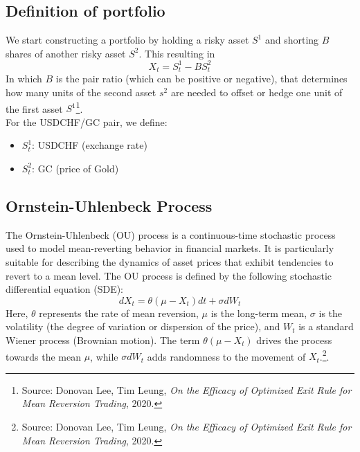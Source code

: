 \documentclass{article}
\begin{document}
\subsection*{Definition of portfolio}
We start constructing a portfolio by holding a risky asset $S^1$ and shorting $B$ shares of another risky asset $S^2$. This resulting in
\begin{equation}
    X_t=S_t^1-BS_t^2
\end{equation}
In which $B$ is the pair ratio (which can be positive or negative), that determines how many units of the second asset $s^2$ are needed to offset or hedge one unit of the first asset $S^1$\footnote{Source: Donovan Lee, Tim Leung, \textit{On the Efficacy of Optimized Exit Rule for Mean Reversion Trading}, 2020.}.\\

For the USDCHF/GC pair, we define:
\begin{itemize}
    \item $S_t^1$: USDCHF (exchange rate)
    \item $S_t^2$: GC (price of Gold)
\end{itemize}

\subsection*{Ornstein-Uhlenbeck Process}
The Ornstein-Uhlenbeck (OU) process is a continuous-time stochastic process used to model mean-reverting behavior in financial markets. It is particularly suitable for describing the dynamics of asset prices that exhibit tendencies to revert to a mean level. The OU process is defined by the following stochastic differential equation (SDE):
\begin{equation}
dX_t = \theta (\mu - X_t) dt + \sigma dW_t
\end{equation}
Here, \( \theta \) represents the rate of mean reversion, \( \mu \) is the long-term mean, \( \sigma \) is the volatility (the degree of variation or dispersion of the price), and \( W_t \) is a standard Wiener process (Brownian motion). The term \( \theta (\mu - X_t) \) drives the process towards the mean \( \mu \), while \( \sigma dW_t \) adds randomness to the movement of \( X_t \).\footnote{Source: Donovan Lee, Tim Leung, \textit{On the Efficacy of Optimized Exit Rule for Mean Reversion Trading}, 2020.}.
\end{document}
